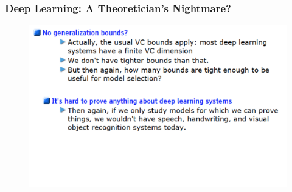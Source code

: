 \documentclass{beamer}
\begin{document}
\begin{frame}
\frametitle{Deep Learning: A Theoretician's Nightmare?}
\begin{figure}
      \includegraphics[width=1\textwidth]{figs/intro12.png}
\end{figure}
\end{frame}
\end{document}
